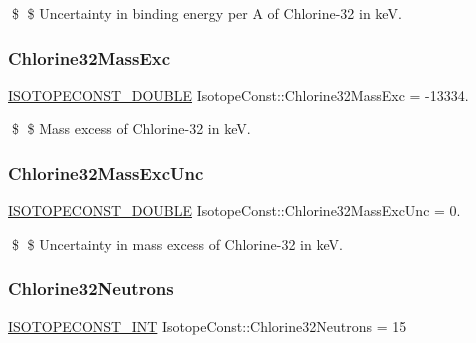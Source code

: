\$ \$ Uncertainty in binding energy per A of Chlorine-\/32 in keV. \mbox{\label{group___isotope_const-_chlorine-_cl32_ga31c8ce0d59419cb5f600c756db2f067e}} 
\subsubsection{\texorpdfstring{Chlorine32\+Mass\+Exc}{Chlorine32MassExc}}
{\footnotesize\ttfamily \mbox{\hyperlink{group___isotope_const-_macros_ga8f45a7272ce02c0b4c65c44636ed719a}{I\+S\+O\+T\+O\+P\+E\+C\+O\+N\+S\+T\+\_\+\+D\+O\+U\+B\+LE}} Isotope\+Const\+::\+Chlorine32\+Mass\+Exc = -\/13334.}

\$ \$ Mass excess of Chlorine-\/32 in keV. \mbox{\label{group___isotope_const-_chlorine-_cl32_ga4a12fdb736125decae2b78998e480fba}} 
\subsubsection{\texorpdfstring{Chlorine32\+Mass\+Exc\+Unc}{Chlorine32MassExcUnc}}
{\footnotesize\ttfamily \mbox{\hyperlink{group___isotope_const-_macros_ga8f45a7272ce02c0b4c65c44636ed719a}{I\+S\+O\+T\+O\+P\+E\+C\+O\+N\+S\+T\+\_\+\+D\+O\+U\+B\+LE}} Isotope\+Const\+::\+Chlorine32\+Mass\+Exc\+Unc = 0.}

\$ \$ Uncertainty in mass excess of Chlorine-\/32 in keV. \mbox{\label{group___isotope_const-_chlorine-_cl32_gaa510b219bcdb841beaa3e74ac83097da}} 
\subsubsection{\texorpdfstring{Chlorine32\+Neutrons}{Chlorine32Neutrons}}
{\footnotesize\ttfamily \mbox{\hyperlink{group___isotope_const-_macros_ga5f18360b3e99483a35c32d789e62621c}{I\+S\+O\+T\+O\+P\+E\+C\+O\+N\+S\+T\+\_\+\+I\+NT}} Isotope\+Const\+::\+Chlorine32\+Neutrons = 15}

